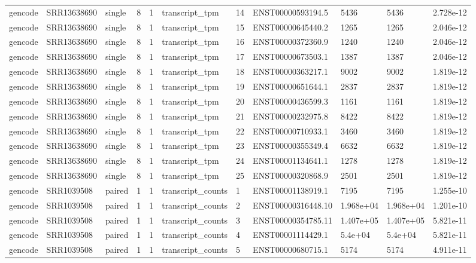 \begin{tabular}{lllllllllll}
gencode & SRR13638690 & single & 8 & 1 & transcript\_tpm & 14 & ENST00000593194.5 & 5436 & 5436 & 2.728e-12 \\
gencode & SRR13638690 & single & 8 & 1 & transcript\_tpm & 15 & ENST00000645440.2 & 1265 & 1265 & 2.046e-12 \\
gencode & SRR13638690 & single & 8 & 1 & transcript\_tpm & 16 & ENST00000372360.9 & 1240 & 1240 & 2.046e-12 \\
gencode & SRR13638690 & single & 8 & 1 & transcript\_tpm & 17 & ENST00000673503.1 & 1387 & 1387 & 2.046e-12 \\
gencode & SRR13638690 & single & 8 & 1 & transcript\_tpm & 18 & ENST00000363217.1 & 9002 & 9002 & 1.819e-12 \\
gencode & SRR13638690 & single & 8 & 1 & transcript\_tpm & 19 & ENST00000651644.1 & 2837 & 2837 & 1.819e-12 \\
gencode & SRR13638690 & single & 8 & 1 & transcript\_tpm & 20 & ENST00000436599.3 & 1161 & 1161 & 1.819e-12 \\
gencode & SRR13638690 & single & 8 & 1 & transcript\_tpm & 21 & ENST00000232975.8 & 8422 & 8422 & 1.819e-12 \\
gencode & SRR13638690 & single & 8 & 1 & transcript\_tpm & 22 & ENST00000710933.1 & 3460 & 3460 & 1.819e-12 \\
gencode & SRR13638690 & single & 8 & 1 & transcript\_tpm & 23 & ENST00000355349.4 & 6632 & 6632 & 1.819e-12 \\
gencode & SRR13638690 & single & 8 & 1 & transcript\_tpm & 24 & ENST00001134641.1 & 1278 & 1278 & 1.819e-12 \\
gencode & SRR13638690 & single & 8 & 1 & transcript\_tpm & 25 & ENST00000320868.9 & 2501 & 2501 & 1.819e-12 \\
gencode & SRR1039508 & paired & 1 & 1 & transcript\_counts & 1 & ENST00001138919.1 & 7195 & 7195 & 1.255e-10 \\
gencode & SRR1039508 & paired & 1 & 1 & transcript\_counts & 2 & ENST00000316448.10 & 1.968e+04 & 1.968e+04 & 1.201e-10 \\
gencode & SRR1039508 & paired & 1 & 1 & transcript\_counts & 3 & ENST00000354785.11 & 1.407e+05 & 1.407e+05 & 5.821e-11 \\
gencode & SRR1039508 & paired & 1 & 1 & transcript\_counts & 4 & ENST00001114429.1 & 5.4e+04 & 5.4e+04 & 5.821e-11 \\
gencode & SRR1039508 & paired & 1 & 1 & transcript\_counts & 5 & ENST00000680715.1 & 5174 & 5174 & 4.911e-11 \\

\end{tabular}
